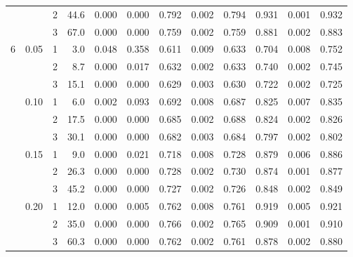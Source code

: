 \begin{table}[ht]
\begin{tabular}{rrr rrr rrr rrr}
 &  & 2 & 44.6 & 0.000 & 0.000 & 0.792 & 0.002 & 0.794 & 0.931 & 0.001 & 0.932 \\
 &  & 3 & 67.0 & 0.000 & 0.000 & 0.759 & 0.002 & 0.759 & 0.881 & 0.002 & 0.883 \\
\midrule
6 & 0.05 & 1 & 3.0 & 0.048 & 0.358 & 0.611 & 0.009 & 0.633 & 0.704 & 0.008 & 0.752 \\
 &  & 2 & 8.7 & 0.000 & 0.017 & 0.632 & 0.002 & 0.633 & 0.740 & 0.002 & 0.745 \\
 &  & 3 & 15.1 & 0.000 & 0.000 & 0.629 & 0.003 & 0.630 & 0.722 & 0.002 & 0.725 \\
 & 0.10 & 1 & 6.0 & 0.002 & 0.093 & 0.692 & 0.008 & 0.687 & 0.825 & 0.007 & 0.835 \\
 &  & 2 & 17.5 & 0.000 & 0.000 & 0.685 & 0.002 & 0.688 & 0.824 & 0.002 & 0.826 \\
 &  & 3 & 30.1 & 0.000 & 0.000 & 0.682 & 0.003 & 0.684 & 0.797 & 0.002 & 0.802 \\
 & 0.15 & 1 & 9.0 & 0.000 & 0.021 & 0.718 & 0.008 & 0.728 & 0.879 & 0.006 & 0.886 \\
 &  & 2 & 26.3 & 0.000 & 0.000 & 0.728 & 0.002 & 0.730 & 0.874 & 0.001 & 0.877 \\
 &  & 3 & 45.2 & 0.000 & 0.000 & 0.727 & 0.002 & 0.726 & 0.848 & 0.002 & 0.849 \\
 & 0.20 & 1 & 12.0 & 0.000 & 0.005 & 0.762 & 0.008 & 0.761 & 0.919 & 0.005 & 0.921 \\
 &  & 2 & 35.0 & 0.000 & 0.000 & 0.766 & 0.002 & 0.765 & 0.909 & 0.001 & 0.910 \\
 &  & 3 & 60.3 & 0.000 & 0.000 & 0.762 & 0.002 & 0.761 & 0.878 & 0.002 & 0.880 \\
\bottomrule
\end{tabular}
\end{table}
